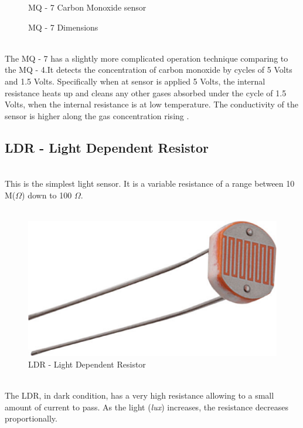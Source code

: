 \documentclass[12pt,a4paper,draft]{report}
\begin{document}
\begin{figure}[H]
\caption{MQ - 7 Carbon Monoxide  sensor}
\caption{MQ - 7 Dimensions}
\end{figure}
\ \\
The MQ - 7 has a slightly more complicated operation technique comparing to the MQ - 4.It detects the concentration of carbon monoxide by cycles of 5 Volts and 1.5 Volts. Specifically when at sensor is applied 5 Volts, the internal resistance heats up and cleans any other gases absorbed under the cycle of 1.5 Volts, when the internal resistance is at low temperature. The conductivity of the sensor is higher along the gas concentration rising \cite{website:mq7_datasheet}.
\ \\
%
\subsection{LDR - Light Dependent Resistor}
\ \\
This is the simplest light sensor. It is a variable resistance of a range between 10 M($\Omega$) down to 100 $\Omega$.
\\ \
\begin{figure}[H]
\centering
\includegraphics*[scale=0.2]{ldr}
\caption{LDR - Light Dependent Resistor}
\end{figure}
\ \\
The LDR, in dark condition, has a very high resistance allowing to a small amount of current to pass. As the light (\textit{lux}) increases, the resistance decreases proportionally.
\ \\
%
\end{document}
